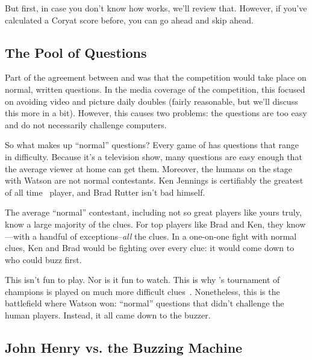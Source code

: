 
But first, in case you don't know how \jeopardy{} works, we'll review
that.
%
However, if you've calculated a Coryat score before, you can go ahead
and skip ahead.


\subsection{The Pool of Questions}


Part of the agreement between \jeopardy{} and  was that the
competition would take place on normal, written questions.
%
In the media coverage of the competition, this focused on avoiding
video and picture daily doubles (fairly reasonable, but we'll discuss
this more in a bit).
%
However, this causes two problems: the questions are too easy and do
not necessarily challenge computers.

So what makes up ``normal'' questions?
%
Every game of \jeopardy{} has questions that range in difficulty.
%
Because it's a television show, many questions are easy enough that
the average viewer at home can get them.
%
Moreover, the humans on the stage with Watson are not normal contestants.
%
Ken Jennings is certifiably the greatest of all
time~\citep[]{low-20} \jeopardy{} player, and Brad Rutter
isn't bad himself.

The average ``normal'' \jeopardy{} contestant, including not so great
players like yours truly, know a large majority of the clues.
%
For top players like Brad and Ken, they know---with a handful of
exceptions--\emph{all} the clues.
%
In a one-on-one fight with normal clues, Ken and Brad would be
fighting over every clue: it would come down to who could buzz first.

This isn't fun to play.
%
Nor is it fun to watch.
%
This is why \jeopardyp{}'s tournament of champions is played on much
more difficult clues~\citep{harris-06}.
%
Nonetheless, this is the battlefield where Watson won: ``normal''
questions that didn't challenge the human players.
%
Instead, it all came down to the buzzer.

\subsection{John Henry vs. the Buzzing Machine}

